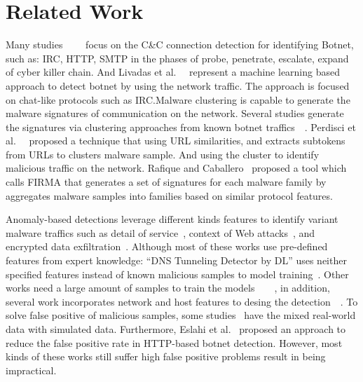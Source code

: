 \section{Related Work}

Many studies~\cite{feily2009survey}~\cite{barford2007inside}~\cite{strayer2008botnet}~\cite{atluri2017botnets} focus on the C\&C connection detection for identifying Botnet, such as: IRC, HTTP, SMTP in the phases of probe, penetrate, escalate, expand of cyber killer chain. And Livadas et al.~\cite{carl2006using}~\cite{strayer2006detecting} represent a machine learning based approach to detect botnet by using the network traffic. The approach is focused on chat-like protocols such as IRC.Malware clustering is capable to generate the malware signatures of communication on the network. Several studies generate the signatures via clustering approaches from known botnet traffics~\cite{p:zarras14}~\cite{nelms2013execscent}. Perdisci et al.~\cite{perdisci2013scalable}~\cite{perdisci2010behavioral} proposed a technique that using URL similarities, and extracts subtokens from URLs to clusters malware sample. And using the cluster to identify malicious traffic on the network. Rafique and Caballero~\cite{rafique2013firma} proposed a tool which calls FIRMA that generates a set of signatures for each malware family by aggregates malware samples into families based on similar protocol features.  

Anomaly-based detections leverage different kinds features to identify variant malware traffics such as detail of service~\cite{p:feinstein03}, context of Web attacks~\cite{p:krugel03}, and encrypted data exfiltration~\cite{p:he14}.  Although most of these works use pre-defined features from expert knowledge: “DNS Tunneling Detector by DL” uses neither specified features instead of known malicious samples to model training~\cite{j:zhang16}. Other works need a large amount of samples to train the models~\cite{bilge2012disclosure}~\cite{gu2008botminer}~\cite{binkley2006algorithm}~\cite{karasaridis2007wide}, in addition, several work incorporates network and host features to desing the detection~\cite{p:schwenk11}~\cite{borders2004web}.  To solve false positive of malicious samples, some studies~\cite{wang2018botcapturer} have the mixed real-world data with simulated data. Furthermore, Eslahi et al.~\cite{eslahi2013efficient} proposed an approach to reduce the false positive rate in HTTP-based botnet detection. However, most kinds of these works still suffer high false positive problems result in being impractical.

